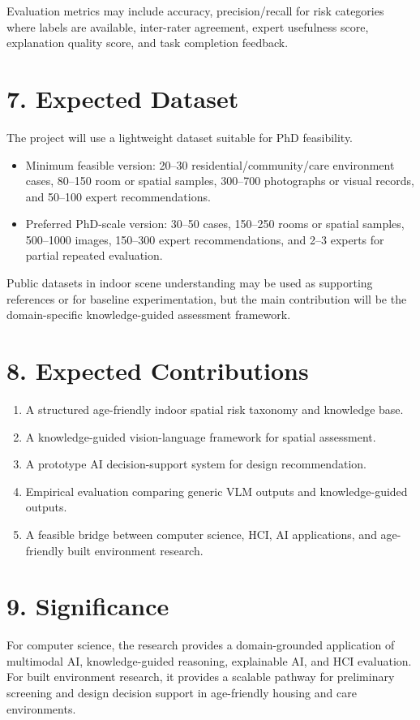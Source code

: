 \documentclass[11pt,a4paper]{article}
\begin{document}
Evaluation metrics may include accuracy, precision/recall for risk categories where labels are available, inter-rater agreement, expert usefulness score, explanation quality score, and task completion feedback.

\section*{7. Expected Dataset}
The project will use a lightweight dataset suitable for PhD feasibility.

\begin{itemize}
  \item Minimum feasible version: 20--30 residential/community/care environment cases, 80--150 room or spatial samples, 300--700 photographs or visual records, and 50--100 expert recommendations.
  \item Preferred PhD-scale version: 30--50 cases, 150--250 rooms or spatial samples, 500--1000 images, 150--300 expert recommendations, and 2--3 experts for partial repeated evaluation.
\end{itemize}

Public datasets in indoor scene understanding may be used as supporting references or for baseline experimentation, but the main contribution will be the domain-specific knowledge-guided assessment framework.

\section*{8. Expected Contributions}
\begin{enumerate}
  \item A structured age-friendly indoor spatial risk taxonomy and knowledge base.
  \item A knowledge-guided vision-language framework for spatial assessment.
  \item A prototype AI decision-support system for design recommendation.
  \item Empirical evaluation comparing generic VLM outputs and knowledge-guided outputs.
  \item A feasible bridge between computer science, HCI, AI applications, and age-friendly built environment research.
\end{enumerate}

\section*{9. Significance}
For computer science, the research provides a domain-grounded application of multimodal AI, knowledge-guided reasoning, explainable AI, and HCI evaluation. For built environment research, it provides a scalable pathway for preliminary screening and design decision support in age-friendly housing and care environments.
\end{document}
